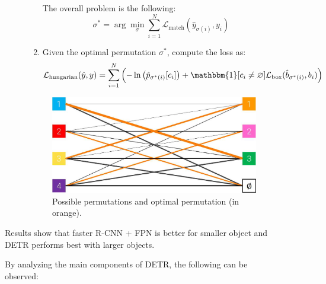 \begin{description}
\begin{description}
\begin{enumerate}
                    The overall problem is the following:
                    \[ \sigma^* = \arg\min_\sigma \sum_{i=1}^{N} \mathcal{L}_\text{match}(\hat{y}_{\sigma(i)}, y_i) \]

                    \item Given the optimal permutation $\sigma^*$, compute the loss as:
                    \[ \mathcal{L}_\text{hungarian}(\hat{y}, y) = \sum_{i=1}^{N} \left( - \ln\left( \hat{p}_{\sigma^*(i)}[c_i] \right) + \mathbbm{1}[c_i \neq \varnothing] \mathcal{L}_\text{box}(\hat{b}_{\sigma^*(i)}, b_i) \right) \]
                \end{enumerate}

                \begin{figure}[H]
                    \centering
                    \includegraphics[width=0.5\linewidth]{./img/hungarian_loss.jpg}
                    \caption{
                        Possible permutations and optimal permutation (in orange).
                    }
                \end{figure}
        \end{description}

        \begin{remark}
            Results show that faster R-CNN + FPN is better for smaller object and DETR performs best with larger objects.
        \end{remark}

        \begin{remark}[Visualization]
            By analyzing the main components of DETR, the following can be observed:
\end{remark}
\end{description}
